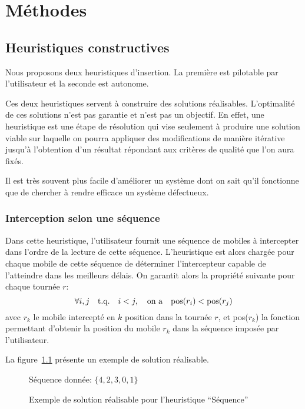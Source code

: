 \chapter{Méthodes}
	\section{Heuristiques constructives}
		Nous proposons deux heuristiques d'insertion. La première est pilotable par l'utilisateur et la seconde est autonome.

		Ces deux heuristiques servent à construire des solutions réalisables. L'optimalité de ces solutions n'est pas garantie et n'est pas un objectif. En effet, une heuristique est une étape de résolution qui vise seulement à produire une solution viable sur laquelle on pourra appliquer des modifications de manière itérative jusqu'à l'obtention d'un résultat répondant aux critères de qualité que l'on aura fixés.

		Il est très souvent plus facile d'améliorer un système dont on sait qu'il fonctionne que de chercher à rendre efficace un système défectueux.
		\subsection{Interception selon une séquence}
		\label{sub:heuristic_sequence}
			Dans cette heuristique, l'utilisateur fournit une séquence de mobiles à intercepter dans l'ordre de la lecture de cette séquence. L'heuristique est alors chargée pour chaque mobile de cette séquence de déterminer l'intercepteur capable de l'atteindre dans les meilleurs délais. On garantit alors la propriété suivante pour chaque tournée $r$:
			\[
				\forall i, j \qtext{t.q.}  i<j, \qtext{on a} \text{pos}(r_i) < \text{pos}(r_j)
			\]
			avec $r_k$ le mobile intercepté en $k$\ieme{} position dans la tournée $r$, et pos($r_k$) la fonction permettant d'obtenir la position du mobile $r_k$ dans la séquence imposée par l'utilisateur.

			La figure~\ref{fig:heuristic_sequence_demo} présente un exemple de solution réalisable.

			\begin{figure}[h!]
			\centering
			Séquence donnée: $\{4, 2, 3, 0, 1\}$

			\begin{tikzpicture}[schema]
				
			\end{tikzpicture}
			\caption{Exemple de solution réalisable pour l'heuristique ``Séquence''}
			\label{fig:heuristic_sequence_demo}
			\end{figure}

